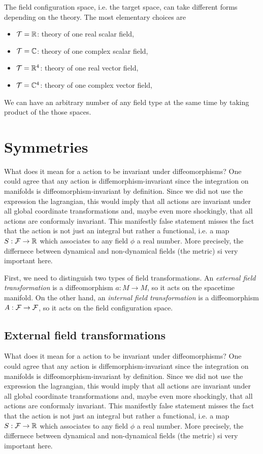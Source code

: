 \documentclass[a4paper,10pt]{article}
\begin{document}
    The field configuration space, i.e. the target space, can take different forms depending on the theory. The most elementary choices are
    \begin{itemize}
        \item $\mathcal{T}=\mathbb{R}$: theory of one real scalar field,
        \item $\mathcal{T}=\mathbb{C}$: theory of one complex scalar field,
        \item $\mathcal{T}=\mathbb{R}^4$: theory of one real vector field,
        \item $\mathcal{T}=\mathbb{C}^4$: theory of one complex vector field,
    \end{itemize}
    We can have an arbitrary number of any field type at the same time by taking product of the those spaces.

\section{Symmetries}

    What does it mean for a action to be invariant under diffeomorphisms? One could agree that any action is diffemorphism-invariant since the integration on manifolds is diffeomorphism-invariant by definition. Since we did not use the expression the lagrangian, this would imply that all actions are invariant under all global coordinate transformations and, maybe even more shockingly, that all actions are conformaly invariant. This manifestly false statement misses the fact that the action is not just an integral but rather a functional, i.e. a map $S:\mathcal{F}\to\mathbb{R}$ which associates to any field $\phi$ a real number. More precisely, the differnece between dynamical and non-dynamical fields (the metric) si very important here.

    First, we need to distinguish two types of field transformations. An \emph{external field transformation} is a diffeomorphism $a:M\to M$, so it acts on the spacetime manifold. On the other hand, an \emph{internal field transformation} is a diffeomorphism $A:\mathcal{F}\to\mathcal{F}$, so it acts on the field configuration space.

    \subsection{External field transformations}

        What does it mean for a action to be invariant under diffeomorphisms? One could agree that any action is diffemorphism-invariant since the integration on manifolds is diffeomorphism-invariant by definition. Since we did not use the expression the lagrangian, this would imply that all actions are invariant under all global coordinate transformations and, maybe even more shockingly, that all actions are conformaly invariant. This manifestly false statement misses the fact that the action is not just an integral but rather a functional, i.e. a map $S:\mathcal{F}\to\mathbb{R}$ which associates to any field $\phi$ a real number. More precisely, the differnece between dynamical and non-dynamical fields (the metric) si very important here.
\end{document}
